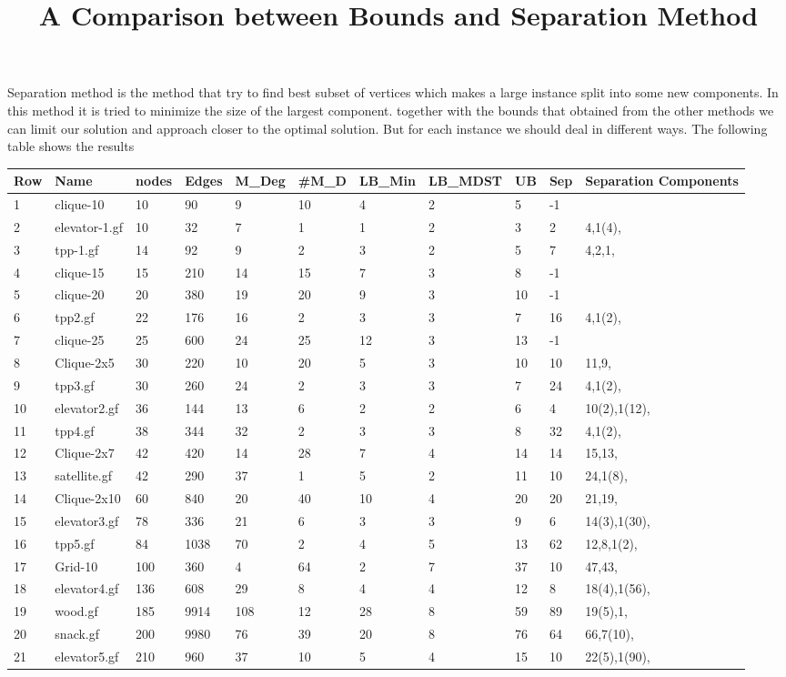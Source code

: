 \documentclass{article}
\title{A Comparison between Bounds and Separation Method}
\begin{document}
\maketitle
Separation method is the method that try to find best subset of vertices which makes a large instance split into some new components. In this method it is tried to minimize the size of the largest component. together with the bounds that obtained from the other methods we can limit our solution and approach closer to the optimal solution. But for each instance we should deal in different ways. The following table shows the results 
\begin{longtable}{|l |l |l |l |l |l |l |l |l |l |l |}
\hline
Row&Name&nodes&Edges&M\_Deg&\#M_D&LB\_Min&LB\_MDST&UB&Sep&Separation Components\\
\hline
1&clique-10&10&90&9&10&4&2&5&-1&\\
2&elevator-1.gf&10&32&7&1&1&2&3&2&4,1(4),\\
3&tpp-1.gf&14&92&9&2&3&2&5&7&4,2,1,\\
4&clique-15&15&210&14&15&7&3&8&-1&\\
5&clique-20&20&380&19&20&9&3&10&-1&\\
6&tpp2.gf&22&176&16&2&3&3&7&16&4,1(2),\\
7&clique-25&25&600&24&25&12&3&13&-1&\\
8&Clique-2x5&30&220&10&20&5&3&10&10&11,9,\\
9&tpp3.gf&30&260&24&2&3&3&7&24&4,1(2),\\
10&elevator2.gf&36&144&13&6&2&2&6&4&10(2),1(12),\\
11&tpp4.gf&38&344&32&2&3&3&8&32&4,1(2),\\
12&Clique-2x7&42&420&14&28&7&4&14&14&15,13,\\
13&satellite.gf&42&290&37&1&5&2&11&10&24,1(8),\\
14&Clique-2x10&60&840&20&40&10&4&20&20&21,19,\\
15&elevator3.gf&78&336&21&6&3&3&9&6&14(3),1(30),\\
16&tpp5.gf&84&1038&70&2&4&5&13&62&12,8,1(2),\\
17&Grid-10&100&360&4&64&2&7&37&10&47,43,\\
18&elevator4.gf&136&608&29&8&4&4&12&8&18(4),1(56),\\
19&wood.gf&185&9914&108&12&28&8&59&89&19(5),1,\\
20&snack.gf&200&9980&76&39&20&8&76&64&66,7(10),\\
21&elevator5.gf&210&960&37&10&5&4&15&10&22(5),1(90),\\

\end{longtable}
\end{document}
